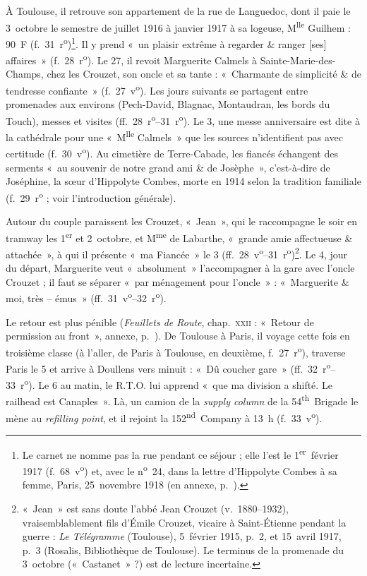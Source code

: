À Toulouse, il retrouve son appartement de la rue de Languedoc, dont il paie le 3~octobre le semestre de juillet 1916 à janvier 1917 à sa logeuse, M\textsuperscript{lle} Guilhem : 90~F (f.~31~r\textsuperscript{o})\footnote{Le carnet ne nomme pas la rue pendant ce séjour ; elle l'est le 1\textsuperscript{er}~février 1917 (f.~68~v\textsuperscript{o}) et, avec le n\textsuperscript{o}~24, dans la lettre d'Hippolyte Combes à sa femme, Paris, 25~novembre 1918 (en annexe, p.~\pageref{annexe:doc5-languedoc}).}. Il y prend «~un plaisir extrême à regarder \& ranger [ses] affaires~» (f.~28~r\textsuperscript{o}). Le 27, il revoit Marguerite Calmels à Sainte-Marie-des-Champs, chez les Crouzet, son oncle et sa tante : «~Charmante de simplicité \& de tendresse confiante~» (f.~27~v\textsuperscript{o}). Les jours suivants se partagent entre promenades aux environs (Pech-David, Blagnac, Montaudran, les bords du Touch), messes et visites (ff.~28~r\textsuperscript{o}--31~r\textsuperscript{o}). Le 3, une messe anniversaire est dite à la cathédrale pour une «~M\textsuperscript{lle} Calmels~» que les sources n'identifient pas avec certitude (f.~30~v\textsuperscript{o}). Au cimetière de Terre-Cabade, les fiancés échangent des serments «~au souvenir de notre grand ami \& de Josèphe~», c'est-à-dire de Joséphine, la sœur d'Hippolyte Combes, morte en 1914 selon la tradition familiale (f.~29~r\textsuperscript{o} ; voir l'introduction générale).

Autour du couple paraissent les Crouzet, «~Jean~», qui le raccompagne le soir en tramway les 1\textsuperscript{er} et 2~octobre, et M\textsuperscript{me} de Labarthe, «~grande amie affectueuse \& attachée~», à qui il présente «~ma Fiancée~» le 3 (ff.~28~v\textsuperscript{o}--31~r\textsuperscript{o})\footnote{«~Jean~» est sans doute l'abbé Jean Crouzet (v.~1880--1932), vraisemblablement fils d'Émile Crouzet, vicaire à Saint-Étienne pendant la guerre : \textit{Le Télégramme} (Toulouse), 5~février 1915, p.~2, et 15~avril 1917, p.~3 (Rosalis, Bibliothèque de Toulouse). Le terminus de la promenade du 3~octobre («~Castanet~» ?) est de lecture incertaine.}. Le 4, jour du départ, Marguerite veut «~absolument~» l'accompagner à la gare avec l'oncle Crouzet ; il faut se séparer «~par ménagement pour l'oncle~» : «~Marguerite \& moi, très -- émus~» (ff.~31~v\textsuperscript{o}--32~r\textsuperscript{o}).

Le retour est plus pénible (\textit{Feuillets de Route}, chap.~\textsc{xxii} : «~Retour de permission au front~», annexe, p.~\pageref{annexe:doc6-xxii}). De Toulouse à Paris, il voyage cette fois en troisième classe (à l'aller, de Paris à Toulouse, en deuxième, f.~27~r\textsuperscript{o}), traverse Paris le 5 et arrive à Doullens vers minuit : «~Dû coucher gare~» (ff.~32~r\textsuperscript{o}--33~r\textsuperscript{o}). Le 6 au matin, le R.T.O. lui apprend «~que ma division a shifté. Le railhead est Canaples~». Là, un camion de la \textit{supply column} de la 54\textsuperscript{th}~Brigade le mène au \textit{refilling point}, et il rejoint la 152\textsuperscript{nd}~Company à 13~h (f.~33~v\textsuperscript{o}).

